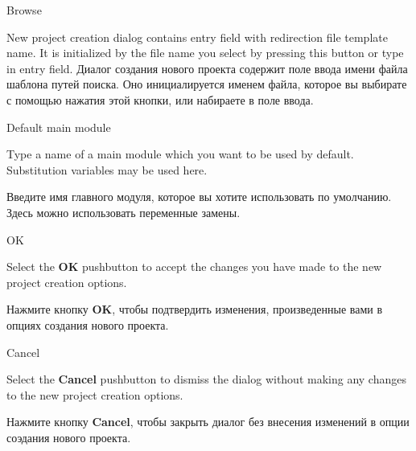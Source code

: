 \begin{popup}
\caption{Browse}

\ifenglish
New project creation dialog contains entry field with redirection file template name.
It is initialized by the file name you select by pressing this button or type
in entry field.
\else
Диалог создания нового проекта содержит поле ввода имени файла шаблона путей поиска.
Оно инициалируется именем файла, которое вы выбирате с помощью нажатия этой 
кнопки, или набираете в поле ввода.
\fi
\end{popup}

\begin{popup}
\caption{Default main module}

\ifenglish
Type a name of a main module which you want to be used by default.
Substitution variables may be used here.

\else
Введите имя главного модуля, которое вы хотите использовать по умолчанию. 
Здесь можно использовать переменные замены.
\fi
\end{popup}

\begin{popup}
\caption{OK}

\ifenglish
Select the {\bf OK} pushbutton to accept the changes you have made
to the new project creation options.

\else
Нажмите кнопку {\bf OK}, чтобы подтвердить изменения, произведенные вами
в опциях создания нового проекта. 
\fi
\end{popup}

\begin{popup}
\caption{Cancel}

\ifenglish
Select the {\bf Cancel} pushbutton to dismiss the dialog without
making any changes to the new project creation options.

\else
Нажмите кнопку {\bf Cancel}, чтобы закрыть диалог без внесения изменений в 
опции соэдания нового проекта.
\fi
\end{popup}
